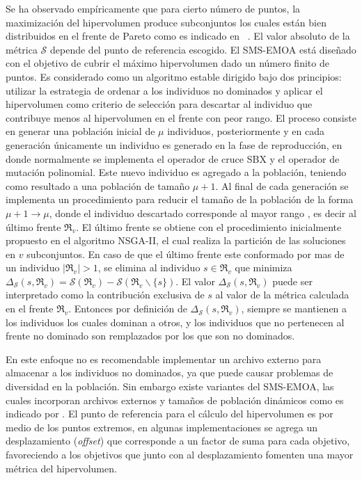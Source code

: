 Se ha observado empíricamente que para cierto número de puntos, la maximización del hipervolumen produce subconjuntos los cuales están bien distribuidos en el frente de Pareto como es indicado en ~\cite{Joel:BoundedArchivingUsingTheLebesgueMeasure, Joel:AnEMOAlgorithmUsingTheHypervolumeMeasureAsSelectionCriterion}.
%
El valor absoluto de la métrica $\mathscr{S}$ depende del punto de referencia escogido.
El SMS-EMOA está diseñado con el objetivo de cubrir el máximo hipervolumen dado un número finito de puntos.
%
Es considerado como un algoritmo estable dirigido bajo dos principios: utilizar la estrategia de ordenar a los individuos no dominados y aplicar el hipervolumen como criterio de selección para descartar al individuo que contribuye menos al hipervolumen en el frente con peor rango.
%
El proceso consiste en generar una población inicial de $\mu$ individuos, posteriormente y en cada generación únicamente un individuo es generado en la fase de reproducción, en donde normalmente se implementa el operador de cruce SBX y el operador de mutación polinomial.
%
Este nuevo individuo es agregado a la población, teniendo como resultado a una población de tamaño $\mu + 1$.
%
Al final de cada generación se implementa un procedimiento para reducir el tamaño de la población de la forma $\mu + 1 \rightarrow \mu$, donde el individuo descartado corresponde al mayor rango , es decir al último frente $\Re_v$.
%
El último frente se obtiene con el procedimiento inicialmente propuesto en el algoritmo NSGA-II, el cual realiza la partición de las soluciones en $v$ subconjuntos. 
%
En caso de que el último frente este conformado por mas de un individuo $|\Re_v| > 1$, se elimina al individuo $s \in \Re_v$ que minimiza $\Delta_{ \mathscr{S} }(s, \Re_v) = \mathscr{S}(\Re_v) -\mathscr{S} (\Re_v \backslash \{ s\})$.
%
El valor $\Delta_{\mathscr{S}}(s,\Re_v)$ puede ser interpretado como la contribución exclusiva de $s$ al valor de la métrica calculada en el frente $\Re_v$.
%
Entonces por definición de $\Delta_{\mathscr{S}}(s,\Re_v)$, siempre se mantienen a los individuos los cuales dominan a otros, y los individuos que no pertenecen al frente no dominado son remplazados por los que son no dominados.
%

En este enfoque no es recomendable implementar un archivo externo para almacenar a los individuos no dominados, ya que puede causar problemas de diversidad en la población.
%
Sin embargo existe variantes del SMS-EMOA, las cuales incorporan archivos externos y tamaños de población dinámicos como es indicado por \cite{Joel:BoundedArchivingUsingTheLebesgueMeasure}.
%
El punto de referencia para el cálculo del hipervolumen es por medio de los puntos extremos, en algunas implementaciones se agrega un desplazamiento (\textit{offset}) que corresponde a un factor de suma para cada objetivo, favoreciendo a los objetivos que junto con al desplazamiento fomenten una mayor métrica del hipervolumen.
%

